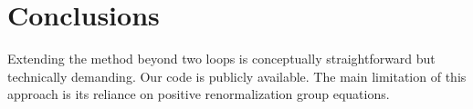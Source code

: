 \section{Conclusions}\label{sec:conclusions}

Extending the method beyond two loops is conceptually straightforward
but technically demanding. Our code is publicly available. The main
limitation of this approach is its reliance on positive renormalization
group equations.

